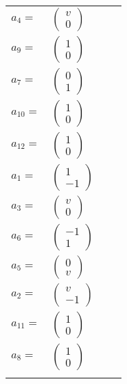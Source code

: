 \documentclass[1p]{elsarticle_modified}
\theoremstyle{definition}
\begin{document}
\begin{tabular}{m{7pt} m{180pt} m{7pt} m{180pt} }
\flushright $a_{4}=$&$\begin{pmatrix}v\\0\end{pmatrix}$ \\
\flushright $a_{9}=$&$\begin{pmatrix}1\\0\end{pmatrix}$ \\
\flushright $a_{7}=$&$\begin{pmatrix}0\\1\end{pmatrix}$ \\
\flushright $a_{10}=$&$\begin{pmatrix}1\\0\end{pmatrix}$ \\
\flushright $a_{12}=$&$\begin{pmatrix}1\\0\end{pmatrix}$ \\
\flushright $a_{1}=$&$\begin{pmatrix}1\\-1\end{pmatrix}$ \\
\flushright $a_{3}=$&$\begin{pmatrix}v\\0\end{pmatrix}$ \\
\flushright $a_{6}=$&$\begin{pmatrix}-1\\1\end{pmatrix}$ \\
\flushright $a_{5}=$&$\begin{pmatrix}0\\v\end{pmatrix}$ \\
\flushright $a_{2}=$&$\begin{pmatrix}v\\-1\end{pmatrix}$ \\
\flushright $a_{11}=$&$\begin{pmatrix}1\\0\end{pmatrix}$ \\
\flushright $a_{8}=$&$\begin{pmatrix}1\\0\end{pmatrix}$\\&\end{tabular}
\end{document}
